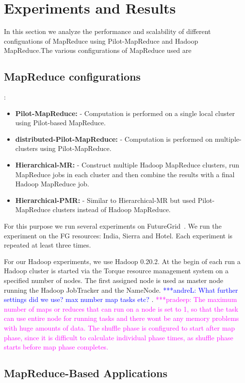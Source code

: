\documentclass{acm_proc_article-sp}
\newcommand{\alnote}[1]{ {\textcolor{blue} { ***andreL: #1 }}}
\newcommand{\pnote}[1]{ {\textcolor{magenta} { ***pradeep: #1 }}}
\newcommand{\alnote}[1]{}
\newcommand{\pnote}[1]{}
\newcommand{\pilotmapreduce}{Pilot-MapReduce\xspace}
\begin{document}
\section{Experiments and Results}


In this section we analyze the performance and scalability of different configuations of MapReduce using 
\pilotmapreduce and  Hadoop MapReduce.The various configurations of MapReduce used are


\subsection{MapReduce configurations}:
\begin{itemize}
\item \textbf{\pilotmapreduce:}  - Computation is performed on a single local cluster using Pilot-based MapReduce.
\item \textbf{distributed-\pilotmapreduce:} - Computation is performed on multiple-clusters using \pilotmapreduce.
\item \textbf{Hierarchical-MR:} - Construct multiple Hadoop MapReduce clusters, run MapReduce jobs in each cluster and then combine the results with a final Hadoop MapReduce job. 
\item \textbf{Hierarchical-PMR:} - Similar to Hierarchical-MR but used \pilotmapreduce clusters instead of Hadoop MapReduce.
\end{itemize}

For this purpose we run several experiments
on FutureGrid~\cite{fg}. We run the experiment on the FG resources: India, 
Sierra and Hotel. Each experiment is repeated at least three times.

For our Hadoop experiments, we use Hadoop 0.20.2. At the begin of each run a 
Hadoop cluster is started via the Torque resource management system on a
specified number of nodes. The first assigned node is used as master node
running the Hadoop JobTracker and the NameNode. \alnote{What further settings
did we use? max number map tasks etc?}. \pnote{The maximum number of maps or 
reduces that can run on a node is set to 1, so that the task can use entire
node for running tasks and there wont be any memory problems with huge amounts
of data. The shuffle phase is configured to start after map phase, since it is
difficult to calculate individual phase times, as shuffle phase starts before
map phase completes.}


\subsection{MapReduce-Based Applications}
\end{document}

